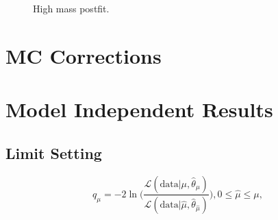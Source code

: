 \begin{figure}[!hbtp]
\caption{High mass postfit.}
\label{fig:high_mass_postfit}
\end{figure}

\section{MC Corrections}

\section{Model Independent Results}

\subsection{Limit Setting}

\begin{equation}
  q_{\mu} = -2 \ln \Biggl(\frac{\mathcal{L}(\text{data} | \mu, \hat{\theta}_{\mu})}{\mathcal{L}(\text{data} | \hat{\mu}, \hat{\theta}_{\hat{\mu}})}\Biggl), 0 \leq \hat{\mu} \leq \mu,
\end{equation}

